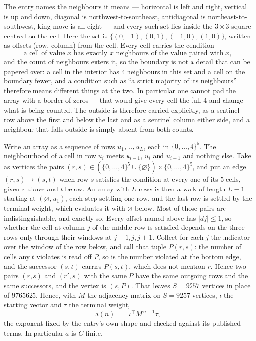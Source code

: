 \documentclass[11pt,a4paper]{article}
\theoremstyle{plain}
\theoremstyle{definition}
\begin{document}
The entry names the neighbours it means --- horizontal is left and right, vertical is up and
down, diagonal is northwest-to-southeast, antidiagonal is northeast-to-southwest, king-move is
all eight --- and every such set lies inside the $3\times3$ square centred on the cell. Here
the set is $\{(0,-1), (0,1), (-1,0), (1,0)\}$, written as offsets (row, column) from the cell. Every cell carries
the condition
\[
\text{a cell of value }x\text{ has exactly }x\text{ neighbours of the value paired with }x,
\]
and the count of neighbours enters it, so the boundary is not a detail that can be papered
over: a cell in the interior has $4$ neighbours in this set and a cell on the boundary
fewer, and a condition such as ``a strict majority of its neighbours'' therefore means
different things at the two. In particular one cannot pad the array with a border of zeros ---
that would give every cell the full $4$ and change what is being counted. The outside is
therefore carried
explicitly, as a sentinel row above the first and below the last and as a sentinel column
either side, and a neighbour that falls outside is simply absent from both counts.

Write an array as a sequence of rows $u_1,\dots,u_L$, each in
$\{0,\dots,4\}^{5}$. The neighbourhood of a cell in row $u_i$ meets $u_{i-1}$,
$u_i$ and $u_{i+1}$ and nothing else. Take as vertices the pairs
$(r,s)\in(\{0,\dots,4\}^{5}\cup\{\varnothing\})\times\{0,\dots,4\}^{5}$,
and put an edge $(r,s)\to(s,t)$ when row $s$ satisfies the condition at every one of its
$5$ cells, given $r$ above and $t$ below. An array with $L$ rows is then a walk of length
$L-1$ starting at $(\varnothing,u_1)$, each step settling one row, and the last row is
settled by the terminal weight, which evaluates it with $\varnothing$ below. Most of those pairs are indistinguishable, and exactly so. Every offset named above has $|dj|\le 1$, so whether the cell at column $j$ of the middle row is satisfied depends on the three rows only through their windows at $j-1,j,j+1$. Collect for each $j$ the indicator over the window of the row below, and call that tuple $P(r,s)$: the number of cells any $t$ violates is read off $P$, so is the number violated at the bottom edge, and the successor $(s,t)$ carries $P(s,t)$, which does not mention $r$. Hence two pairs $(r,s)$ and $(r',s)$ with the same $P$ have the same outgoing rows and the same successors, and the vertex is $(s,P)$. That leaves $S=9257$ vertices in place of $9765625$. Hence,
with $M$ the adjacency matrix on $S=9257$ vertices, $\iota$ the starting vector and $\tau$ the
terminal weight,
\[
a(n)\;=\;\,\iota^{\!\top}M^{\,n-1}\tau ,
\]
the exponent fixed by the entry's own shape and checked against its published terms. In
particular $a$ is $C$-finite.
\end{document}
